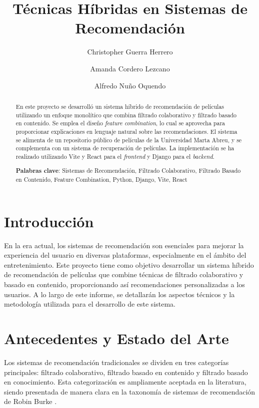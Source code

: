 \documentclass{llncs}
\begin{document}
	
	\title{Técnicas Híbridas en Sistemas de Recomendación}
	\author{Christopher Guerra Herrero \and Amanda Cordero Lezcano \and Alfredo Nuño Oquendo}
	
	\maketitle
	
	\begin{abstract}
		En este proyecto se desarrolló un sistema híbrido de recomendación de películas utilizando un enfoque monolítico que combina filtrado colaborativo y filtrado basado en contenido. Se emplea el diseño \textit{feature combination}, lo cual se aprovecha para proporcionar explicaciones en lenguaje natural sobre las recomendaciones. El sistema se alimenta de un repositorio público de películas de la Universidad Marta Abreu, y se complementa con un sistema de recuperación de películas. La implementación se ha realizado utilizando Vite y React para el 	\textit{frontend} y Django para el 	\textit{backend}. 
		
		\textbf{Palabras clave}: Sistemas de Recomendación, Filtrado Colaborativo, Filtrado Basado en Contenido, Feature Combination, Python, Django, Vite, React
	\end{abstract}
	
	\section{Introducción}
	En la era actual, los sistemas de recomendación son esenciales para mejorar la experiencia del usuario en diversas plataformas, especialmente en el ámbito del entretenimiento. Este proyecto tiene como objetivo desarrollar un sistema híbrido de recomendación de películas que combine técnicas de filtrado colaborativo y basado en contenido, proporcionando así recomendaciones personalizadas a los usuarios. A lo largo de este informe, se detallarán los aspectos técnicos y la metodología utilizada para el desarrollo de este sistema.
	
	\section{Antecedentes y Estado del Arte}
	Los sistemas de recomendación tradicionales se dividen en tres categorías principales: filtrado colaborativo, filtrado basado en contenido y filtrado basado en conocimiento. Esta categorización es ampliamente aceptada en la literatura, siendo presentada de manera clara en la taxonomía de sistemas de recomendación de Robin Burke \cite{burke2002hybrid}. 
	
\end{document}
